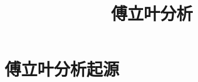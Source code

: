 \documentclass{book}
\begin{document}
\title{傅立叶分析}
\maketitle

\chapter{傅立叶分析起源}


\cite{stein2003}


\end{document}
